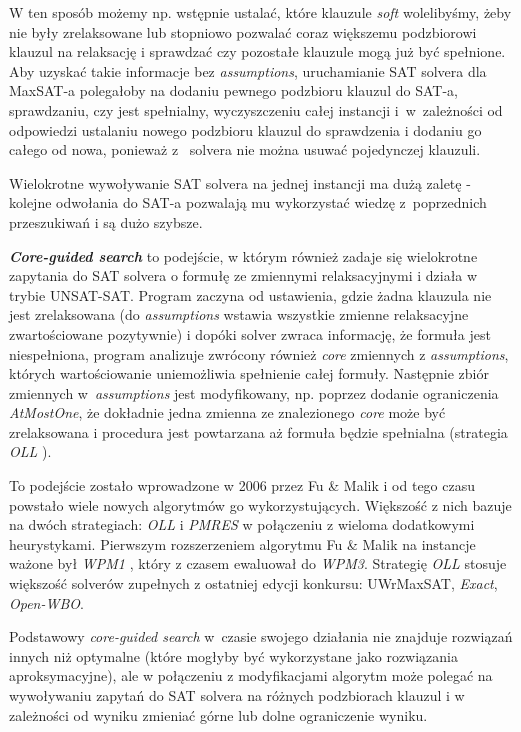 \documentclass[shortabstract]{iithesis}
\begin{document}
W ten sposób możemy np. wstępnie ustalać, które klauzule \textit{soft} wolelibyśmy, żeby nie były zrelaksowane lub stopniowo pozwalać coraz większemu podzbiorowi klauzul na relaksację i sprawdzać czy pozostałe klauzule mogą już być spełnione.
Aby uzyskać takie informacje bez \textit{assumptions}, uruchamianie SAT solvera dla MaxSAT-a polegałoby na dodaniu pewnego podzbioru klauzul do SAT-a, sprawdzaniu, czy jest spełnialny, wyczyszczeniu całej instancji i~w~zależności od odpowiedzi ustalaniu nowego podzbioru klauzul do sprawdzenia i dodaniu go całego od nowa, ponieważ z~	solvera nie można usuwać pojedynczej klauzuli.

Wielokrotne wywoływanie SAT solvera na jednej instancji ma dużą zaletę - kolejne odwołania do SAT-a pozwalają mu wykorzystać wiedzę z~poprzednich przeszukiwań i są dużo szybsze.

\textit{\textbf{Core-guided search}} to podejście, w którym również zadaje się wielokrotne zapytania do SAT solvera o formułę ze zmiennymi relaksacyjnymi i działa w trybie UNSAT-SAT. Program zaczyna od ustawienia, gdzie żadna klauzula nie jest zrelaksowana (do \textit{assumptions} wstawia wszystkie zmienne relaksacyjne zwartościowane pozytywnie) i dopóki solver zwraca informację, że formuła jest niespełniona, program analizuje zwrócony również \textit{core} zmiennych z \textit{assumptions}, których wartościowanie uniemożliwia spełnienie całej formuły. Następnie zbiór zmiennych w~\textit{assumptions} jest modyfikowany, np. poprzez dodanie ograniczenia \textit{AtMostOne}, że dokładnie jedna zmienna ze znalezionego \textit{core} może być zrelaksowana i procedura jest powtarzana aż formuła będzie spełnialna (strategia \textit{OLL} \cite{oll}).

To podejście zostało wprowadzone w 2006 przez Fu \& Malik \cite{fumalik} i od tego czasu powstało wiele nowych algorytmów go wykorzystujących. Większość z nich bazuje na dwóch strategiach: \textit{OLL} i \textit{PMRES} \cite{pmres} w połączeniu z wieloma dodatkowymi heurystykami. Pierwszym rozszerzeniem algorytmu Fu \& Malik na instancje ważone był \textit{WPM1} \cite{wpm1}, który z czasem ewaluował do \textit{WPM3}.
Strategię \textit{OLL} stosuje większość solverów zupełnych z ostatniej edycji konkursu\cite{maxsateval}: UWrMaxSAT, \textit{Exact}, \textit{Open-WBO}.

Podstawowy \textit{core-guided search} w~czasie swojego działania nie znajduje rozwiązań innych niż optymalne (które mogłyby być wykorzystane jako rozwiązania aproksymacyjne), ale w połączeniu z modyfikacjami algorytm może polegać na wywoływaniu zapytań do SAT solvera na różnych podzbiorach klauzul i w zależności od wyniku zmieniać górne lub dolne ograniczenie wyniku. 
\end{document}
